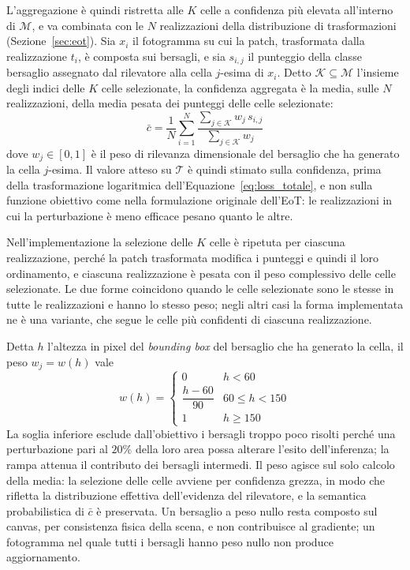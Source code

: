 \ifstampa\documentclass[a4paper,12pt,twoside,openright]{report}\else\documentclass[a4paper,12pt]{report}\fi
\newif\ifrevisione \revisionefalse
\DeclareRobustCommand{\rev}[1]{\ifrevisione{\color{blue!65!black}#1}\else#1\fi}
\newcommand{\notarev}[1]{\ifrevisione\par\medskip\noindent\fcolorbox{blue!65!black}{blue!4}{\parbox{\dimexpr\linewidth-2\fboxsep-2\fboxrule\relax}{\small\setstretch{1}\textbf{Nota per la revisione.} #1}}\par\medskip\fi}
\begin{document}
\rev{L'aggregazione è quindi ristretta alle $K$ celle a confidenza più elevata
all'interno di $\mathcal{M}$, e va combinata con le $N$ realizzazioni della
distribuzione di trasformazioni (Sezione~\ref{sec:eot}). Sia $x_i$ il
fotogramma su cui la patch, trasformata dalla realizzazione $t_i$, è composta
sui bersagli, e sia $s_{i,j}$ il punteggio della classe bersaglio assegnato
dal rilevatore alla cella $j$-esima di $x_i$. Detto $\mathcal{K} \subseteq
\mathcal{M}$ l'insieme degli indici delle $K$ celle selezionate, la confidenza
aggregata è la media, sulle $N$ realizzazioni, della media pesata dei punteggi
delle celle selezionate:
\begin{equation}
    \bar{c} = \frac{1}{N} \sum_{i=1}^{N}
    \frac{\sum_{j \in \mathcal{K}} w_j \, s_{i,j}}{\sum_{j \in \mathcal{K}} w_j}
    \label{eq:topk}
\end{equation}
dove $w_j \in [0,1]$ è il peso di rilevanza dimensionale del bersaglio che ha
generato la cella $j$-esima. Il valore atteso su $\mathcal{T}$ è quindi
stimato sulla confidenza, prima della trasformazione logaritmica
dell'Equazione~\ref{eq:loss_totale}, e non sulla funzione obiettivo come
nella formulazione originale dell'EoT: le realizzazioni in cui la
perturbazione è meno efficace pesano quanto le altre.

Nell'implementazione la selezione delle $K$ celle è ripetuta per ciascuna
realizzazione, perché la patch trasformata modifica i punteggi e quindi il loro
ordinamento, e ciascuna realizzazione è pesata con il peso complessivo delle
celle selezionate. Le due forme coincidono quando le celle selezionate sono le stesse in tutte
le realizzazioni e hanno lo stesso peso; negli altri casi la forma
implementata ne è una variante, che segue le celle più confidenti di ciascuna
realizzazione.

\notarev{Formula riscritta come concordato in call, con l'insieme
$\mathcal{K}$ comune alle realizzazioni e il fattore $1/N$. La differenza con
l'implementazione è dichiarata nel paragrafo precedente.}} Detta $h$ l'altezza in pixel del \textit{bounding
box} \rev{del bersaglio che ha generato la cella}, il peso \rev{$w_j = w(h)$} vale
\begin{equation}
    w(h) =
    \begin{cases}
        0 & h < 60 \\[2pt]
        \dfrac{h - 60}{90} & 60 \leq h < 150 \\[6pt]
        1 & h \geq 150
    \end{cases}
    \label{eq:peso_tattico}
\end{equation}
La soglia inferiore esclude dall'obiettivo i bersagli troppo poco risolti perché
una perturbazione pari al $20\%$ della loro area possa alterare l'esito
dell'inferenza; la rampa attenua il contributo dei bersagli intermedi. Il peso
agisce sul solo calcolo della media: la selezione delle celle avviene per
confidenza grezza, in modo che rifletta la distribuzione effettiva dell'evidenza
del rilevatore, e la semantica probabilistica di $\bar{c}$ è preservata. Un
bersaglio a peso nullo resta composto sul canvas, per consistenza fisica della
scena, e non contribuisce al gradiente; un fotogramma nel quale tutti i bersagli
hanno peso nullo non produce aggiornamento.
\end{document}
